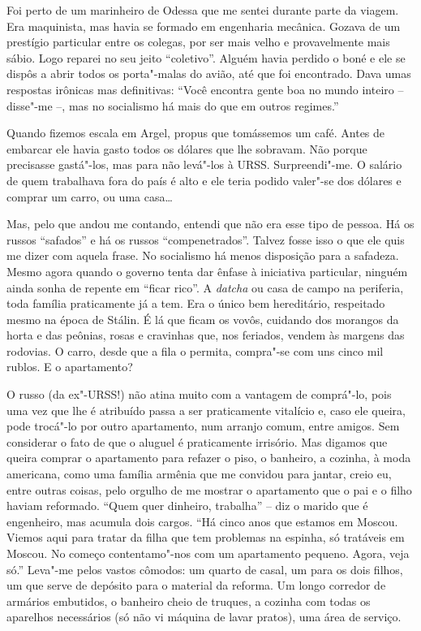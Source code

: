 Foi perto de um marinheiro de Odessa que me sentei durante parte da
viagem. Era maquinista, mas havia se formado em engenharia mecânica.
Gozava de um prestígio particular entre os colegas, por ser mais velho e
provavelmente mais sábio. Logo reparei no seu jeito ``coletivo''. Alguém
havia perdido o boné e ele se dispôs a abrir todos os porta"-malas do
avião, até que foi encontrado. Dava umas respostas irônicas mas
definitivas: ``Você encontra gente boa no mundo inteiro -- disse"-me --,
mas no socialismo há mais do que em outros regimes.''

Quando fizemos escala em Argel, propus que tomássemos um café. Antes de
embarcar ele havia gasto todos os dólares que lhe sobravam. Não porque
precisasse gastá"-los, mas para não levá"-los à URSS. Surpreendi"-me. O
salário de quem trabalhava fora do país é alto e ele teria podido
valer"-se dos dólares e comprar um carro, ou uma casa\ldots{}

Mas, pelo que andou me contando, entendi que não era esse tipo de
pessoa. Há os russos ``safados'' e há os russos ``compenetrados''.
Talvez fosse isso o que ele quis me dizer com aquela frase. No
socialismo há menos disposição para a safadeza. Mesmo agora quando o
governo tenta dar ênfase à iniciativa particular, ninguém ainda sonha de
repente em ``ficar rico''. A \emph{datcha} ou casa de campo na
periferia, toda família praticamente já a tem. Era o único bem
hereditário, respeitado mesmo na época de Stálin. É lá que ficam os
vovôs, cuidando dos morangos da horta e das peônias, rosas e cravinhas
que, nos feriados, vendem às margens das rodovias. O carro, desde que a
fila o permita, compra"-se com uns cinco mil rublos. E o apartamento?

O russo (da ex"-URSS!) não atina muito com a vantagem de comprá"-lo, pois
uma vez que lhe é atribuído passa a ser praticamente vitalício e, caso
ele queira, pode trocá"-lo por outro apartamento, num arranjo comum,
entre amigos. Sem considerar o fato de que o aluguel é praticamente
irrisório. Mas digamos que queira comprar o apartamento para refazer o
piso, o banheiro, a cozinha, à moda americana, como uma família armênia
que me convidou para jantar, creio eu, entre outras coisas, pelo orgulho
de me mostrar o apartamento que o pai e o filho haviam reformado. ``Quem
quer dinheiro, trabalha'' -- diz o marido que é engenheiro, mas acumula
dois cargos. ``Há cinco anos que estamos em Moscou. Viemos aqui para
tratar da filha que tem problemas na espinha, só tratáveis em Moscou. No
começo contentamo"-nos com um apartamento pequeno. Agora, veja só.''
Leva"-me pelos vastos cômodos: um quarto de casal, um para os dois
filhos, um que serve de depósito para o material da reforma. Um longo
corredor de armários embutidos, o banheiro cheio de truques, a cozinha
com todas os aparelhos necessários (só não vi máquina de lavar pratos),
uma área de serviço.

